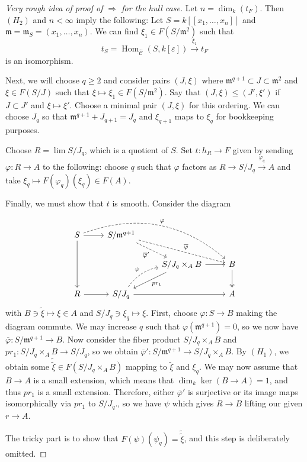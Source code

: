 \documentclass[leqno, openany]{memoir}
\theoremstyle{definition}
\theoremstyle{remark}
\theoremstyle{plain}
\theoremstyle{definition}
\theoremstyle{remark}
\newcommand{\ep}{\varepsilon}
\newcommand{\mc}[1]{\mathcal{#1}}
\newcommand{\mf}[1]{\mathfrak{#1}}
\newcommand{\ol}[1]{\overline{#1}}
\newcommand{\wt}[1]{\widetilde{#1}}
\newcommand{\wh}[1]{\widehat{#1}}
\DeclareMathOperator{\Hom}{Hom}
\begin{document}
\begin{proof}[Very rough idea of proof of $\Rightarrow$ for the hull case]
    Let $n = \dim_k(t_F)$. Then $(H_2)$ and $n < \infty$ imply the following: Let $S = k[[x_1, \ldots, x_n]]$ and $\mf{m} = \mf{m}_S = (x_1, \ldots, x_n)$. We can find $\xi_1 \in F(S/\mf{m}^2)$ such that
    \[ t_S = \Hom_{\wh{\mc{C}}}(S, k[\ep]) \xrightarrow{\xi_1} t_F \]
    is an isomorphism.

    Next, we will choose $q \geq 2$ and consider pairs $(J, \xi)$ where $\mf{m}^{q+1} \subset J \subset \mf{m}^2$ and $\xi \in F(S/J)$ such that $\xi \mapsto \xi_1 \in F(S/\mf{m}^2)$. Say that $(J, \xi) \leq (J', \xi')$ if $J \subset J'$ and $\xi \mapsto \xi'$. Choose a minimal pair $(J, \xi)$ for this ordering. We can choose $J_{q}$ so that $\mf{m}^{q+1} + J_{q+1} = J_q$ and $\xi_{q+1}$ maps to $\xi_q$ for bookkeeping purposes.

    Choose $R = \lim S/J_q$, which is a quotient of $S$. Set $t \colon h_R \to F$ given by sending $\varphi \colon R \to A$ to the following: choose $q$ such that $\varphi$ factors as $R \to S/J_q \xrightarrow{\varphi_q} A$ and take $\xi_q \mapsto F(\varphi_q)(\xi_q) \in F(A)$.

    Finally, we must show that $t$ is smooth. Consider the diagram
    \begin{equation*}
    \begin{tikzcd}
        S \ar{dd} \ar{r} \ar[dashrightarrow,bend left=30]{drrr}{\varphi} & S/\mf{m}^{q+1} \ar[dashrightarrow,swap]{dr}{\ol{\varphi}'} \ar[dashrightarrow]{drr}{\ol{\varphi}} \\ 
        & & S/J_q \times_A B \ar{dl}{pr_1} \ar{r} & B \ar[twoheadrightarrow]{d} \\
        R \ar{r} & S/J_q \ar{rr} \ar[dashrightarrow,bend left=20]{ur}{\psi} & & A
    \end{tikzcd}
    \end{equation*}
    with $B \ni \wt{\xi} \mapsto \xi \in A$ and $S/J_q \ni \xi_q \mapsto \xi$. First, choose $\varphi \colon S \to B$ making the diagram commute. We may increase $q$ such that $\varphi(\mf{m}^{q+1}) = 0$, so we now have $\ol{\varphi} \colon S/\mf{m}^{q+1} \to B$. Now consider the fiber product $S/J_q \times_A B$ and $pr_1 \colon S/J_q \times_A B \to S/J_q$, so we obtain $\ol{\varphi}' \colon S/\mf{m}^{q+1} \to S/J_q \times_A B$. By $(H_1)$, we obtain some $\wt{\wt{\xi}} \in F(S/J_q \times_A B)$ mapping to $\wt{\xi}$ and $\xi_q$. We may now assume that $B \to A$ is a small extension, which means that $\dim_k \ker(B \to A) = 1$, and thus $pr_1$ is a small extension. Therefore, either $\ol{\varphi}'$ is surjective or its image maps isomorphically via $pr_1$ to $S/J_q$., so we have $\psi$ which gives $R \to B$ lifting our given $r \to A$.

    The tricky part is to show that $F(\psi)(\psi_q) = \wt{\wt{\xi}}$, and this step is deliberately omitted.
\end{proof}
\end{document}
